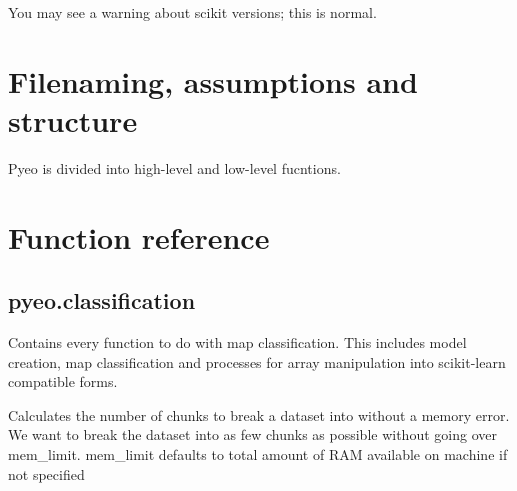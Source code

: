 \documentclass[letterpaper,10pt,english]{sphinxmanual}
\begin{document}
\begin{sphinxVerbatim}[commandchars=\\\{\}]
 
   
\end{sphinxVerbatim}

You may see a warning about scikit versions; this is normal.


\chapter{Filenaming, assumptions and structure}
\label{\detokenize{index:filenaming-assumptions-and-structure}}
Pyeo is divided into high-level and low-level fucntions.


\chapter{Function reference}
\label{\detokenize{index:module-pyeo.classification}}\label{\detokenize{index:function-reference}}

\section{pyeo.classification}
\label{\detokenize{index:pyeo-classification}}
Contains every function to do with map classification. This includes model creation, map classification and processes
for array manipulation into scikit-learn compatible forms.

\begin{fulllineitems}
\label{\detokenize{index:pyeo.classification.autochunk}}
Calculates the number of chunks to break a dataset into without a memory error.
We want to break the dataset into as few chunks as possible without going over mem\_limit.
mem\_limit defaults to total amount of RAM available on machine if not specified

\end{fulllineitems}
\end{document}
